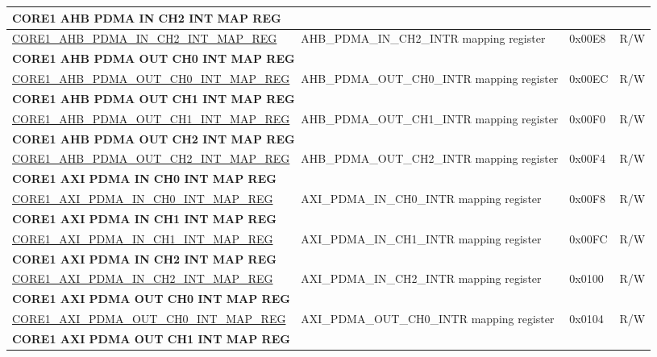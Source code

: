 \begin{longtable}{ | p{7.5cm} | p{7.2cm} | p{1.3cm} | p{1cm} | }
\multicolumn{4}{|l|}{\textbf{CORE1 AHB PDMA IN CH2 INT MAP REG}} \\ \hline
\hyperref[regdesc:CORE1AHBPDMAINCH2INTMAPREG]{CORE1\_AHB\_PDMA\_IN\_CH2\_INT\_MAP\_REG} & AHB\_PDMA\_IN\_CH2\_INTR mapping register & 0x00E8 & R/W \\ \hline
\multicolumn{4}{|l|}{\textbf{CORE1 AHB PDMA OUT CH0 INT MAP REG}} \\ \hline
\hyperref[regdesc:CORE1AHBPDMAOUTCH0INTMAPREG]{CORE1\_AHB\_PDMA\_OUT\_CH0\_INT\_MAP\_REG} & AHB\_PDMA\_OUT\_CH0\_INTR mapping register & 0x00EC & R/W \\ \hline
\multicolumn{4}{|l|}{\textbf{CORE1 AHB PDMA OUT CH1 INT MAP REG}} \\ \hline
\hyperref[regdesc:CORE1AHBPDMAOUTCH1INTMAPREG]{CORE1\_AHB\_PDMA\_OUT\_CH1\_INT\_MAP\_REG} & AHB\_PDMA\_OUT\_CH1\_INTR mapping register & 0x00F0 & R/W \\ \hline
\multicolumn{4}{|l|}{\textbf{CORE1 AHB PDMA OUT CH2 INT MAP REG}} \\ \hline
\hyperref[regdesc:CORE1AHBPDMAOUTCH2INTMAPREG]{CORE1\_AHB\_PDMA\_OUT\_CH2\_INT\_MAP\_REG} & AHB\_PDMA\_OUT\_CH2\_INTR mapping register & 0x00F4 & R/W \\ \hline
\multicolumn{4}{|l|}{\textbf{CORE1 AXI PDMA IN CH0 INT MAP REG}} \\ \hline
\hyperref[regdesc:CORE1AXIPDMAINCH0INTMAPREG]{CORE1\_AXI\_PDMA\_IN\_CH0\_INT\_MAP\_REG} & AXI\_PDMA\_IN\_CH0\_INTR mapping register & 0x00F8 & R/W \\ \hline
\multicolumn{4}{|l|}{\textbf{CORE1 AXI PDMA IN CH1 INT MAP REG}} \\ \hline
\hyperref[regdesc:CORE1AXIPDMAINCH1INTMAPREG]{CORE1\_AXI\_PDMA\_IN\_CH1\_INT\_MAP\_REG} & AXI\_PDMA\_IN\_CH1\_INTR mapping register & 0x00FC & R/W \\ \hline
\multicolumn{4}{|l|}{\textbf{CORE1 AXI PDMA IN CH2 INT MAP REG}} \\ \hline
\hyperref[regdesc:CORE1AXIPDMAINCH2INTMAPREG]{CORE1\_AXI\_PDMA\_IN\_CH2\_INT\_MAP\_REG} & AXI\_PDMA\_IN\_CH2\_INTR mapping register & 0x0100 & R/W \\ \hline
\multicolumn{4}{|l|}{\textbf{CORE1 AXI PDMA OUT CH0 INT MAP REG}} \\ \hline
\hyperref[regdesc:CORE1AXIPDMAOUTCH0INTMAPREG]{CORE1\_AXI\_PDMA\_OUT\_CH0\_INT\_MAP\_REG} & AXI\_PDMA\_OUT\_CH0\_INTR mapping register & 0x0104 & R/W \\ \hline
\multicolumn{4}{|l|}{\textbf{CORE1 AXI PDMA OUT CH1 INT MAP REG}} \\ \hline

\end{longtable}
